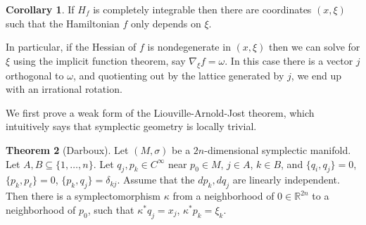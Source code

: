 \documentclass[12pt]{report}
\newcommand{\RR}{\mathbb{R}}
\theoremstyle{definition}
\newtheorem{theorem}{Theorem}[chapter]
\newtheorem{corollary}[theorem]{Corollary}
\begin{document}
\begin{corollary}
If $H_f$ is completely integrable then there are coordinates $(x, \xi)$ such that the Hamiltonian $f$ only depends on $\xi$.
\end{corollary}
In particular, if the Hessian of $f$ is nondegenerate in $(x, \xi)$ then we can solve for $\xi$ using the implicit function theorem, say $\nabla_\xi f = \omega$. In this case there is a vector $j$ orthogonal to $\omega$, and quotienting out by the lattice generated by $j$, we end up with an irrational rotation.

We first prove a weak form of the Liouville-Arnold-Jost theorem, which intuitively says that symplectic geometry is locally trivial.
\begin{theorem}[Darboux]
Let $(M, \sigma)$ be a $2n$-dimensional symplectic manifold. Let $A,B \subseteq \{1, \dots, n\}$. Let $q_j, p_k \in C^\infty$ near $p_0 \in M$, $j \in A$, $k \in B$, and $\{q_i, q_j\}= 0 $, $\{p_k, p_\ell\} = 0$, $\{p_k, q_j\}= \delta_{kj}$.
Assume that the $dp_k,dq_j$ are linearly independent.
Then there is a symplectomorphism $\kappa$ from a neighborhood of $0 \in \RR^{2n}$ to a neighborhood of $p_0$, such that $\kappa^*q_j = x_j$, $\kappa^*p_k = \xi_k$.
\end{theorem}
\end{document}
